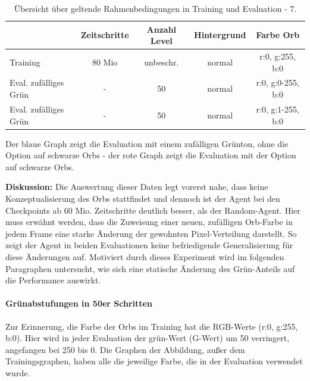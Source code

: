 \begin{center}
 \begin{table}[htp!]
 \begin{center}
  \begin{tabular}{ l c c c c }
    \hline
		               & Zeitschritte & Anzahl Level & Hintergrund & Farbe Orb \\ \hline \hline
     Training              & 80 Mio       & unbeschr.	  & 	    normal & r:0, g:255, b:0 \\ \hline
     Eval. zufälliges Grün 	& -	        	   & 50		  & 	    normal 	& r:0, g:0-255, b:0 \\ \hline
     Eval. zufälliges Grün 	& -	        	   & 50		  & 	    normal 	& r:0, g:1-255, b:0 \\ \hline
    \hline
  \end{tabular}
  \caption{Übersicht über geltende Rahmenbedingungen in Training und Evaluation - 7.}
  \label{tab:tab_durch_EXP_trainSetting7}
  \end{center}
 \end{table}
\end{center} 

Der blaue Graph zeigt die Evaluation mit einem zufälligen Grünton, ohne die Option auf schwarze Orbs - der rote Graph zeigt die Evaluation mit der Option auf schwarze Orbs. 

\textbf{Diskussion:} Die Auswertung dieser Daten legt vorerst nahe, dass keine Konzeptualisierung des Orbs stattfindet und dennoch ist der Agent bei den Checkpoints ab 60 Mio. Zeitschritte deutlich besser, als der Random-Agent. Hier muss erwähnt werden, dass die Zuweisung einer neuen, zufälligen Orb-Farbe in jedem Frame eine starke Änderung der gewohnten Pixel-Verteilung darstellt. So zeigt der Agent in beiden Evaluationen keine befriedigende Generalisierung für diese Änderungen auf. Motiviert durch dieses Experiment wird im folgenden Paragraphen untersucht, wie sich eine statische Änderung des Grün-Anteils auf die Performance auswirkt.

\paragraph{Grünabstufungen in 50er Schritten}\label{par:durch_EXP_farbÄnd_grünAbstufung}
Zur Erinnerung, die Farbe der Orbs im Training hat die RGB-Werte (r:0, g:255, b:0). Hier wird in jeder Evaluation der grün-Wert (G-Wert) um 50 verringert, angefangen bei 250 bis 0. Die Graphen der Abbildung, außer dem Trainingsgraphen, haben alle die jeweilige Farbe, die in der Evaluation verwendet wurde.

